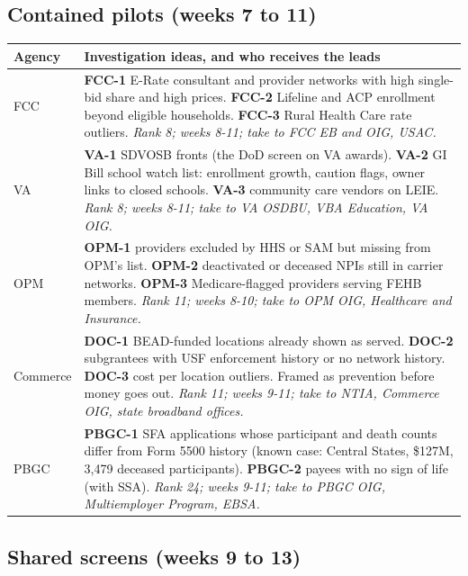 \documentclass[letterpaper,11pt]{article}
\begin{document}
\hypertarget{contained-pilots-weeks-7-to-11}{%
\subsection{Contained pilots (weeks 7 to
11)}\label{contained-pilots-weeks-7-to-11}}

\begingroup\small\setlength{\tabcolsep}{4pt}\renewcommand{\arraystretch}{1.25}
\begin{longtable}[l]{@{}l>{\raggedright\arraybackslash}p{}@{}}
\rowcolor{coolblack}\leavevmode\color{white}\bfseries Agency & \leavevmode\color{white}\bfseries Investigation ideas, and who receives the leads \\
\endhead
FCC & \textbf{FCC-1} E-Rate consultant and provider networks with high single-bid share and high prices. \textbf{FCC-2} Lifeline and ACP enrollment beyond eligible households. \textbf{FCC-3} Rural Health Care rate outliers. \emph{Rank 8; weeks 8-11; take to FCC EB and OIG, USAC.} \\
VA & \textbf{VA-1} SDVOSB fronts (the DoD screen on VA awards). \textbf{VA-2} GI Bill school watch list: enrollment growth, caution flags, owner links to closed schools. \textbf{VA-3} community care vendors on LEIE. \emph{Rank 8; weeks 8-11; take to VA OSDBU, VBA Education, VA OIG.} \\
OPM & \textbf{OPM-1} providers excluded by HHS or SAM but missing from OPM's list. \textbf{OPM-2} deactivated or deceased NPIs still in carrier networks. \textbf{OPM-3} Medicare-flagged providers serving FEHB members. \emph{Rank 11; weeks 8-10; take to OPM OIG, Healthcare and Insurance.} \\
Commerce & \textbf{DOC-1} BEAD-funded locations already shown as served. \textbf{DOC-2} subgrantees with USF enforcement history or no network history. \textbf{DOC-3} cost per location outliers. Framed as prevention before money goes out. \emph{Rank 11; weeks 9-11; take to NTIA, Commerce OIG, state broadband offices.} \\
PBGC & \textbf{PBGC-1} SFA applications whose participant and death counts differ from Form 5500 history (known case: Central States, \$127M, 3,479 deceased participants). \textbf{PBGC-2} payees with no sign of life (with SSA). \emph{Rank 24; weeks 9-11; take to PBGC OIG, Multiemployer Program, EBSA.} \\
\end{longtable}\endgroup

\hypertarget{shared-screens-weeks-9-to-13}{%
\subsection{Shared screens (weeks 9 to
13)}\label{shared-screens-weeks-9-to-13}}
\end{document}
